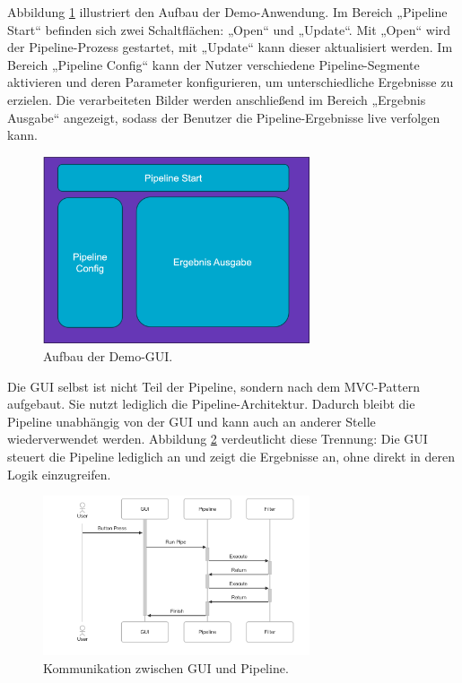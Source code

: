 \documentclass[10pt,a4paper]{article}
\begin{document}
Abbildung \ref{fig:application_structure} illustriert den Aufbau der Demo-Anwendung. Im Bereich „Pipeline Start“ befinden sich zwei Schaltflächen: „Open“ und „Update“. Mit „Open“ wird der Pipeline-Prozess gestartet, mit „Update“ kann dieser aktualisiert werden. Im Bereich „Pipeline Config“ kann der Nutzer verschiedene Pipeline-Segmente aktivieren und deren Parameter konfigurieren, um unterschiedliche Ergebnisse zu erzielen. Die verarbeiteten Bilder werden anschließend im Bereich „Ergebnis Ausgabe“ angezeigt, sodass der Benutzer die Pipeline-Ergebnisse live verfolgen kann.

\begin{figure}[htbp]
    \centering
    \includegraphics[width=0.7\textwidth]{img/ApplicationStructure.png}
    \caption{Aufbau der Demo-GUI.}
    \label{fig:application_structure}
\end{figure}

\begin{samepage}
Die GUI selbst ist nicht Teil der Pipeline, sondern nach dem MVC-Pattern aufgebaut. Sie nutzt lediglich die Pipeline-Architektur. Dadurch bleibt die Pipeline unabhängig von der GUI und kann auch an anderer Stelle wiederverwendet werden. Abbildung \ref{fig:gui_pipeline_interface} verdeutlicht diese Trennung: Die GUI steuert die Pipeline lediglich an und zeigt die Ergebnisse an, ohne direkt in deren Logik einzugreifen.

\begin{figure}[H]
    \centering
    \includegraphics[width=0.7\textwidth]{img/GuiPipelineInterface.png}
    \caption{Kommunikation zwischen GUI und Pipeline.}
    \label{fig:gui_pipeline_interface}
\end{figure}
\end{samepage}
\end{document}
